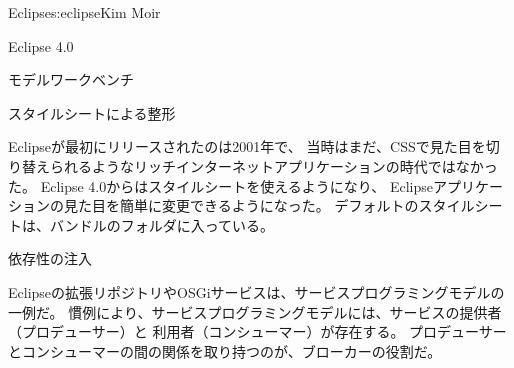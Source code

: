 \begin{aosachapter}{Eclipse}{s:eclipse}{Kim Moir}
\begin{aosasect1}{Eclipse 4.0}
\begin{aosasect2}{モデルワークベンチ}

\end{aosasect2}

\begin{aosasect2}{スタイルシートによる整形}

Eclipseが最初にリリースされたのは2001年で、
当時はまだ、CSSで見た目を切り替えられるようなリッチインターネットアプリケーションの時代ではなかった。
Eclipse 4.0からはスタイルシートを使えるようになり、
Eclipseアプリケーションの見た目を簡単に変更できるようになった。
デフォルトのスタイルシートは、バンドルのフォルダに入っている。

\end{aosasect2}

\begin{aosasect2}{依存性の注入}

Eclipseの拡張リポジトリやOSGiサービスは、サービスプログラミングモデルの一例だ。
慣例により、サービスプログラミングモデルには、サービスの提供者（プロデューサー）と
利用者（コンシューマー）が存在する。
プロデューサーとコンシューマーの間の関係を取り持つのが、ブローカーの役割だ。


\pagebreak


\end{aosasect2}
\end{aosasect1}
\end{aosachapter}
